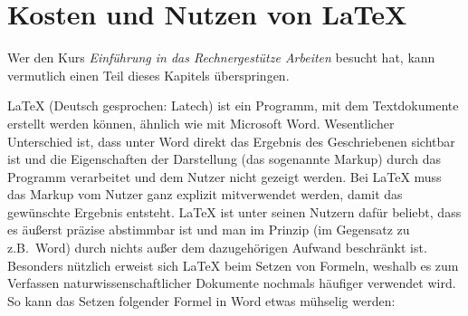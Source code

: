 \section{Kosten und Nutzen von LaTeX}
Wer den Kurs \textit{Einführung in das Rechnergestütze Arbeiten} besucht hat, 
kann vermutlich einen Teil dieses Kapitels überspringen.

LaTeX (Deutsch gesprochen: \glqq Latech\grqq) ist ein Programm, mit dem 
Textdokumente erstellt werden können, ähnlich wie mit Microsoft Word. 
Wesentlicher Unterschied ist, dass unter Word direkt das Ergebnis des 
Geschriebenen sichtbar ist und die Eigenschaften der Darstellung (das sogenannte 
Markup) durch das Programm verarbeitet und dem Nutzer nicht gezeigt werden. Bei 
LaTeX muss das Markup vom Nutzer ganz explizit mitverwendet werden, damit das 
gewünschte Ergebnis entsteht. LaTeX ist unter seinen Nutzern dafür beliebt, dass 
es äußerst präzise abstimmbar ist und man im Prinzip (im Gegensatz zu z.B.~Word) 
durch nichts außer dem dazugehörigen Aufwand beschränkt ist. Besonders nützlich 
erweist sich LaTeX beim Setzen von Formeln, weshalb es zum Verfassen 
naturwissenschaftlicher Dokumente nochmals häufiger verwendet wird. So kann das 
Setzen folgender Formel in Word etwas mühselig werden:

